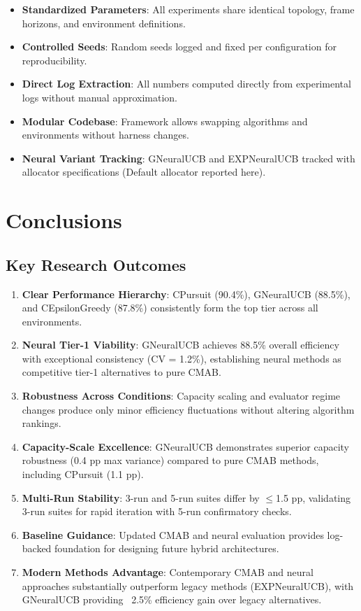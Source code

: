 \documentclass[12pt,a4paper]{article}
\newcommand{\success}[1]{\textcolor{successcolor}{\textbf{#1}}}
\newcommand{\legacy}[1]{\textcolor{legacycolor}{\textbf{#1}}}
\newcommand{\neural}[1]{\textcolor{neuralcolor}{\textbf{#1}}}
\begin{document}
\begin{itemize}
\item \textbf{Standardized Parameters}: All experiments share identical topology, frame horizons, and environment definitions.
\item \textbf{Controlled Seeds}: Random seeds logged and fixed per configuration for reproducibility.
\item \textbf{Direct Log Extraction}: All numbers computed directly from experimental logs without manual approximation.
\item \textbf{Modular Codebase}: Framework allows swapping algorithms and environments without harness changes.
\item \textbf{Neural Variant Tracking}: GNeuralUCB and EXPNeuralUCB tracked with allocator specifications (Default allocator reported here).
\end{itemize}

\newpage
\section{Conclusions}

\subsection{Key Research Outcomes}

\begin{enumerate}
\item \textbf{Clear Performance Hierarchy}: CPursuit (90.4\%), GNeuralUCB (88.5\%), and CEpsilonGreedy (87.8\%) consistently form the top tier across all environments.
\item \neural{Neural Tier-1 Viability}: GNeuralUCB achieves 88.5\% overall efficiency with exceptional consistency (CV = 1.2\%), establishing neural methods as competitive tier-1 alternatives to pure CMAB.
\item \textbf{Robustness Across Conditions}: Capacity scaling and evaluator regime changes produce only minor efficiency fluctuations without altering algorithm rankings.
\item \neural{Capacity-Scale Excellence}: GNeuralUCB demonstrates superior capacity robustness (0.4 pp max variance) compared to pure CMAB methods, including CPursuit (1.1 pp).
\item \success{Multi-Run Stability}: 3-run and 5-run suites differ by $\leq$1.5 pp, validating 3-run suites for rapid iteration with 5-run confirmatory checks.
\item \textbf{Baseline Guidance}: Updated CMAB and neural evaluation provides log-backed foundation for designing future hybrid architectures.
\item \legacy{Modern Methods Advantage}: Contemporary CMAB and neural approaches substantially outperform legacy methods (EXPNeuralUCB), with GNeuralUCB providing ~2.5\% efficiency gain over legacy alternatives.
\end{enumerate}
\end{document}
